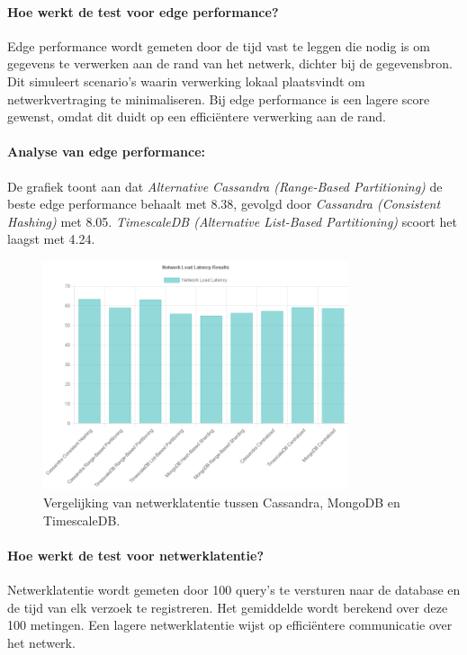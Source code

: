 \paragraph{Hoe werkt de test voor edge performance?} 
Edge performance wordt gemeten door de tijd vast te leggen die nodig is om gegevens te verwerken aan de rand van het netwerk, dichter bij de gegevensbron. Dit simuleert scenario's waarin verwerking lokaal plaatsvindt om netwerkvertraging te minimaliseren. Bij edge performance is een lagere score gewenst, omdat dit duidt op een efficiëntere verwerking aan de rand.

\paragraph{Analyse van edge performance:}
De grafiek toont aan dat \textit{Alternative Cassandra (Range-Based Partitioning)} de beste edge performance behaalt met 8.38, gevolgd door \textit{Cassandra (Consistent Hashing)} met 8.05. \textit{TimescaleDB (Alternative List-Based Partitioning)} scoort het laagst met 4.24.

\begin{figure}[H]
	\centering
	\includegraphics[width=0.8\textwidth]{Network_Load Latency.png}
	\caption{Vergelijking van netwerklatentie tussen Cassandra, MongoDB en TimescaleDB.}
	\label{fig:network-latency-comparison}
\end{figure}

\paragraph{Hoe werkt de test voor netwerklatentie?} 
Netwerklatentie wordt gemeten door 100 query's te versturen naar de database en de tijd van elk verzoek te registreren. Het gemiddelde wordt berekend over deze 100 metingen. Een lagere netwerklatentie wijst op efficiëntere communicatie over het netwerk.

